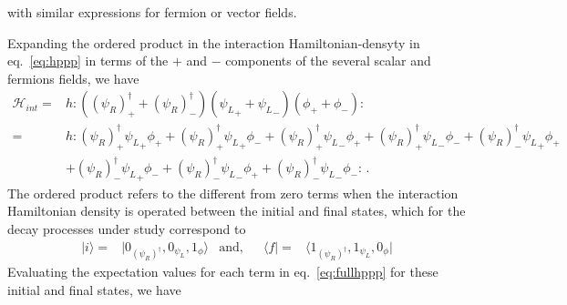 with similar expressions for fermion or vector fields.


Expanding the ordered product in the interaction Hamiltonian-densyty in eq.~\eqref{eq:hppp} in terms of the  $+$ and $-$ components of the several scalar and fermions fields, we have
\begin{align}
\label{eq:fullhppp}
 \mathcal{H}_{int}=&h:\left( (\psi_R)^{\dagger}_{+}+(\psi_R)^{\dagger}_{-}\right) \left( {\psi_L}_{+}+{\psi_L}_{-}\right) \left( \phi_{+}+\phi_{-}\right):\nonumber\\
=&h:
(\psi_R)^{\dagger}_{+}{\psi_L}_{+}\phi_{+}+ 
(\psi_R)^{\dagger}_{+}{\psi_L}_{+}\phi_{-}+ 
(\psi_R)^{\dagger}_{+}{\psi_L}_{-}\phi_{+}+ 
(\psi_R)^{\dagger}_{+}{\psi_L}_{-}\phi_{-}+ 
(\psi_R)^{\dagger}_{-}{\psi_L}_{+}\phi_{+}\nonumber\\ 
&+(\psi_R)^{\dagger}_{-}{\psi_L}_{+}\phi_{-}+ 
(\psi_R)^{\dagger}_{-}{\psi_L}_{-}\phi_{+}+ 
(\psi_R)^{\dagger}_{-}{\psi_L}_{-}\phi_{-} 
:\,.
\end{align}
The ordered product refers to the different from zero terms when the interaction Hamiltonian density is operated between the initial and final states, which for the decay processes under study correspond to
\begin{align}
  |i\rangle=&|0_{(\psi_R)^{\dagger}},0_{{\psi_L}},1_{\phi}\rangle & \text{and,} && \langle f|=&\langle 1_{(\psi_R)^{\dagger}},1_{{\psi_L}},0_\phi|
\end{align}
Evaluating the expectation values for each term in eq.~\eqref{eq:fullhppp} for these initial and final states, we have
